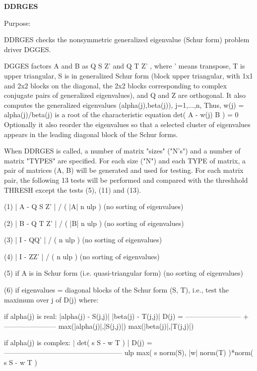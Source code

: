 {\bfseries D\+D\+R\+G\+E\+S} 

\begin{DoxyParagraph}{Purpose\+: }
\begin{DoxyVerb} DDRGES checks the nonsymmetric generalized eigenvalue (Schur form)
 problem driver DGGES.

 DGGES factors A and B as Q S Z'  and Q T Z' , where ' means
 transpose, T is upper triangular, S is in generalized Schur form
 (block upper triangular, with 1x1 and 2x2 blocks on the diagonal,
 the 2x2 blocks corresponding to complex conjugate pairs of
 generalized eigenvalues), and Q and Z are orthogonal. It also
 computes the generalized eigenvalues (alpha(j),beta(j)), j=1,...,n,
 Thus, w(j) = alpha(j)/beta(j) is a root of the characteristic
 equation
                 det( A - w(j) B ) = 0
 Optionally it also reorder the eigenvalues so that a selected
 cluster of eigenvalues appears in the leading diagonal block of the
 Schur forms.

 When DDRGES is called, a number of matrix "sizes" ("N's") and a
 number of matrix "TYPES" are specified.  For each size ("N")
 and each TYPE of matrix, a pair of matrices (A, B) will be generated
 and used for testing. For each matrix pair, the following 13 tests
 will be performed and compared with the threshhold THRESH except
 the tests (5), (11) and (13).


 (1)   | A - Q S Z' | / ( |A| n ulp ) (no sorting of eigenvalues)


 (2)   | B - Q T Z' | / ( |B| n ulp ) (no sorting of eigenvalues)


 (3)   | I - QQ' | / ( n ulp ) (no sorting of eigenvalues)


 (4)   | I - ZZ' | / ( n ulp ) (no sorting of eigenvalues)

 (5)   if A is in Schur form (i.e. quasi-triangular form)
       (no sorting of eigenvalues)

 (6)   if eigenvalues = diagonal blocks of the Schur form (S, T),
       i.e., test the maximum over j of D(j)  where:

       if alpha(j) is real:
                     |alpha(j) - S(j,j)|        |beta(j) - T(j,j)|
           D(j) = ------------------------ + -----------------------
                  max(|alpha(j)|,|S(j,j)|)   max(|beta(j)|,|T(j,j)|)

       if alpha(j) is complex:
                                 | det( s S - w T ) |
           D(j) = ---------------------------------------------------
                  ulp max( s norm(S), |w| norm(T) )*norm( s S - w T )


\end{DoxyVerb}
\end{DoxyParagraph}
